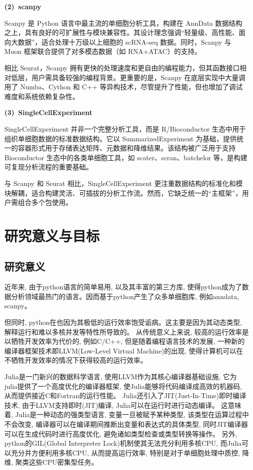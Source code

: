 \textbf{(2)~scanpy}

Scanpy 是 Python 语言中最主流的单细胞分析工具，构建在 AnnData 数据结构之上，具有良好的可扩展性与模块兼容性。其设计理念强调“轻量级、高性能、面向大数据”，适合处理十万级以上细胞的 scRNA-seq 数据。同时，Scanpy 与 Muon 框架联合提供了对多模态数据（如 RNA+ATAC）的支持。

相比 Seurat，Scanpy 拥有更快的处理速度和更自由的编程能力，但其函数接口相对低层，用户需具备较强的编程背景。更重要的是，Scanpy 在底层实现中大量调用了 Numba、Cython 和 C++ 等异构技术，尽管提升了性能，但也增加了调试难度和系统依赖复杂性。

\textbf{(3)~SingleCellExperiment}

SingleCellExperiment 并非一个完整分析工具，而是 R/Bioconductor 生态中用于组织单细胞数据的标准数据结构。它以 SummarizedExperiment 为基础，提供统一的容器形式用于存储表达矩阵、元数据和降维结果。该结构被广泛用于支持 Bioconductor 生态中的各类单细胞工具，如 scater、scran、batchelor 等，是构建可复现分析流程的重要基础。

与 Scanpy 和 Seurat 相比，SingleCellExperiment 更注重数据结构的标准化和模块解耦，适合构建灵活、可插拔的分析工作流。然而，它缺乏统一的“主框架”，用户需组合多个包使用。

\section{研究意义与目标}
\subsection{研究意义}

近年来, 由于python语言的简单易用, 以及其丰富的第三方库, 使得python成为了数据分析领域最热门的语言。因而基于python产生了众多单细胞库, 例如anndata, scanpy。

但同时, python在也因为其极低的运行效率饱受诟病。这主要是因为其动态类型, 解释运行和难以多核并发等特性所导致的。
从传统意义上来说, 较高的运行效率是以牺牲开发效率为代价的, 例如C/C++,
但是随着编程语言技术的发展, 一种新的编译器框架技术即LLVM(Low-Level Virtual Machine)的出现, 使得计算机可以在不牺牲开发效率的情况下获得较高的运行效率。

Julia\supercite{SponsorJuliaLangGitHub,roeschJuliaBiologists2023}是一门新兴的数据科学语言, 使用LLVM作为其核心编译器基础设施, 它为julia提供了一个高度优化的编译器框架, 使Julia能够将代码编译成高效的机器码, 从而提供接近C和Fortran的运行性能。
Julia还引入了JIT(Just-In-Time)即时编译技术, 由于LLVM支持即时(JIT)编译, Julia可以在运行时进行动态编译。
这意味着, Julia是一种动态的强类型语言, 变量一旦被赋予某种类型, 该类型在运算过程中不会改变, 编译器可以在编译期间推断出变量和表达式的具体类型, 同时JIT编译器可以在生成代码时进行高度优化, 避免诸如类型检查或类型转换等操作。
另外, python的GIL(Global Interpreter Lock)机制使其无法充分利用多核CPU, 而Julia可以充分并方便利用多核CPU, 从而提高运行效率, 特别是对于单细胞处理中质控, 降维, 聚类这些CPU密集型任务。

